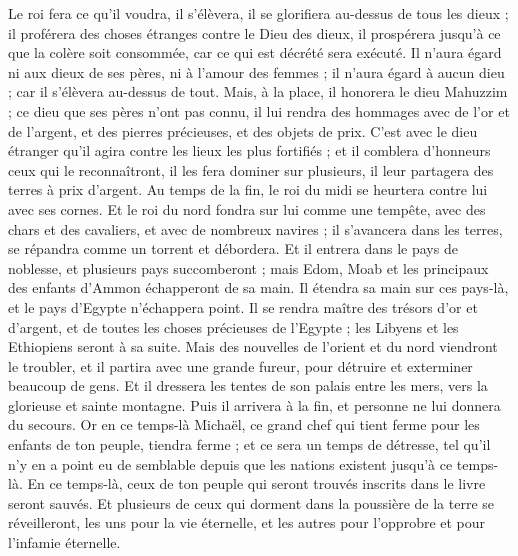 \begin{multicols}{2}
Le roi fera ce qu'il voudra, il s'élèvera, il se glorifiera au-dessus de tous les dieux ; il proférera des choses étranges contre le Dieu des dieux, il prospérera jusqu'à ce que la colère soit consommée, car ce qui est décrété sera exécuté.
Il n'aura égard ni aux dieux de ses pères, ni à l'amour des femmes ; il n'aura égard à aucun dieu ; car il s'élèvera au-dessus de tout.
Mais, à la place, il honorera le dieu Mahuzzim ; ce dieu que ses pères n'ont pas connu, il lui rendra des hommages avec de l'or et de l'argent, et des pierres précieuses, et des objets de prix.
C'est avec le dieu étranger qu'il agira contre les lieux les plus fortifiés ; et il comblera d'honneurs ceux qui le reconnaîtront, il les fera dominer sur plusieurs, il leur partagera des terres à prix d'argent.
Au temps de la fin, le roi du midi se heurtera contre lui avec ses cornes. Et le roi du nord fondra sur lui comme une tempête, avec des chars et des cavaliers, et avec de nombreux navires ; il s'avancera dans les terres, se répandra comme un torrent et débordera.
Et il entrera dans le pays de noblesse, et plusieurs pays succomberont ; mais Edom, Moab et les principaux des enfants d'Ammon échapperont de sa main.
Il étendra sa main sur ces pays-là, et le pays d'Egypte n'échappera point.
Il se rendra maître des trésors d'or et d'argent, et de toutes les choses précieuses de l'Egypte ; les Libyens et les Ethiopiens seront à sa suite.
Mais des nouvelles de l'orient et du nord viendront le troubler, et il partira avec une grande fureur, pour détruire et exterminer beaucoup de gens.
Et il dressera les tentes de son palais entre les mers, vers la glorieuse et sainte montagne. Puis il arrivera à la fin, et personne ne lui donnera du secours.
\VerseOne{}Or en ce temps-là Michaël, ce grand chef qui tient ferme pour les enfants de ton peuple, tiendra ferme ; et ce sera un temps de détresse, tel qu'il n'y en a point eu de semblable depuis que les nations existent jusqu'à ce temps-là. En ce temps-là, ceux de ton peuple qui seront trouvés inscrits dans le livre seront sauvés.
Et plusieurs de ceux qui dorment dans la poussière de la terre se réveilleront, les uns pour la vie éternelle, et les autres pour l'opprobre et pour l'infamie éternelle.

\end{multicols}
